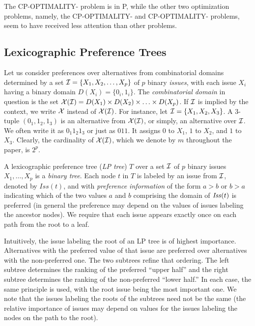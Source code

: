 The CP-OPTIMALITY- problem is in P, while
the other two optimization problems, namely, the CP-OPTIMALITY-
and CP-OPTIMALITY- problems, seem to have received 
less attention than other problems.



\subsection{Lexicographic Preference Trees \label{sec:LPT}}
Let us consider preferences over alternatives from combinatorial domains 
determined by a set $\mathcal{I} = \{X_1, X_2, \ldots, X_p\}$ of $p$ binary 
\emph{issues}, with each issue
$X_i$ having a binary domain $D(X_i) = \{0_i, 1_i\}$. The 
\emph{combinatorial domain} in question is the set $\mathcal{X}(\mathcal{I})=D(X_1) \times 
D(X_2) \times \ldots\times D(X_p)$. If $\mathcal{I}$ is implied by the context, 
we write $\mathcal{X}$ instead of $\mathcal{X}(\mathcal{I})$. For instance, let $\mathcal{I} = \{X_1, X_2, 
X_3\}$. A 3-tuple $(0_1,1_2,1_3)$ is an alternative from $\mathcal{X}(\mathcal{I})$,
or simply, an alternative over $\mathcal{I}$. We 
often write it as $0_1 1_2 1_3$ or just as $011$. It assigns $0$ to 
$X_1$, $1$ to $X_2$, and $1$ to $X_3$.  
Clearly, the cardinality of 
$\mathcal{X}(\mathcal{I})$, which we denote by $m$ throughout the paper, is $2^p$. 

A lexicographic preference tree (\emph{LP tree}) $T$ over a set $\mathcal{I}$ 
of $p$ binary issues $X_1,\ldots,X_p$ is a \emph{binary tree}. Each
node $t$ in $T$ is labeled by an issue from $\mathcal{I}$, denoted by 
$\mathit{Iss}(t)$, and with \emph{preference information} of the form
$a>b$ or $b>a$ indicating which of the two values $a$ and $b$  comprising
the domain of $\mathit{Iss}(t)$ is preferred (in general the preference may depend
on the values of issues labeling the ancestor nodes). We require that 
each issue appears exactly once on each path from the root to a leaf. 

Intuitively, the issue labeling the root of an LP tree is of highest 
importance. Alternatives with the preferred value of that issue
are preferred over alternatives with the non-preferred one. The two
subtrees refine that ordering. The left subtree determines the ranking
of the preferred ``upper half'' and the right subtree determines the 
ranking of the non-preferred ``lower half.'' In each case, the same 
principle is used, with the root issue being the most important one. 
We note that the issues labeling the roots of the 
subtrees need not be the same (the relative importance of issues may 
depend on values for the issues labeling the nodes on the path to the root).

